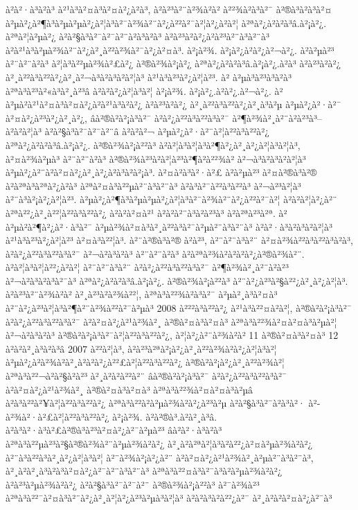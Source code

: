 à²à²·à³à²à³ à²¹à³à²¤à³à²¤à²¿à²à³, à²à²³à²¨à²¾à²à² à²²¾à²à³à²¯ à²®à³à²à³à²¤ à²µà²¿à²¶à³à²µà²µà²¿à²¦à³à²¯à²¾à²¨à²¿à²²à²¯à²¦à²¿à²à²¦ à²ªà²¿à²à²à³â.à²¡à²¿. à²ªà²¦à²µà²¿ à²à²§à³à²¯à²¯à²¨à²à³à²à³ à²à²³à²à²¿à²à²³à²¨à³à²¨à³ à²à²¹à³à²µà²¾à²¨à²¿à²¸à²²à²¾à²¯à²¿à²¤à³. à²¡à²¾. à²¡à²¿à²à²¿à²¬à²¿. à²à²µà²³ à²¨à²¨à²à³ à²¦à³à²²µà²¾à²£à²¿ à²®à²¾à²¡à²¿ à²ªà²¿à²à²à³â.à²¡à²¿.à²à³ à²à²³à²à²¿ à²¸à²²à³à²²à²¿à²¸à²¬à³à²à³à²à²¦à³ à²¹à³à²³à²¿à²¦à²³. à² à²µà³à²³à³à²à³ à²ªà³à²³à²«à³à²¸à²³â à²à²à²¿à²¦à³à²¦ à²¡à²¾. à²¡à²¿.à²à²¿.à²¬à²¿. à²à²µà²\circ à²¹à²¤à³à²¤à²¿à²\circ à²¹à³à²à²¿ à²à²³à²à²¿ à²¸à²²à³à²²à²¿à²¸à³à²µ à²µà²¿à²·à²¯ à²¤à²¿à²³à²¿à²¸à²¿, âà²®à²à²¡à³à²¯ à²à²¿à²²à³à²²à³à²¯ à²¶à²¾à²¸à²¨à²à²³à³– à²à²à²¦à³ à²à²§à³à²¯à²¯à²¨â à²à²à²¬ à²µà²¿à²·à²¯à²¦à²²à³à²²à²¿ à²ªà²¿à²à²à³â.à²¡à²¿. à²®à²¾à²¡à²²à³ à²à²¦à³à²¦à³à²¶à²¿à²¸à²¿à²¦à³à²¦à³, à²¤à²¾à²µà³ à²¨à²¨à²à³ à²®à²¾à²³à²à²¦à²³à²¶à²à²²¾à² à²¬à³à²à³à²à²¦à³ à²µà²¿à²¨à²à²¤à²¿à²¸à²¿à²à³à²à²¡à³. à²¤à²à³à²·à²£ à²à²µà²³ à²¤à²®à³à²® à²à²ªà³à²ªà²¿à²à³ à²ªà²¤à³à²²µà²¨à³à²¨à³ à²à³à²¯à²²à³à²²à³ à²¬à²³à²¦à³ à²¨à³à²¡à²¿à²¦à²³. à²µà²¿à²¶à³à²µà²µà²¿à²¦à³à²¯à²¾à²¨à²¿à²²à²¯à²¦ à²à²à²¦à²¿à²¨ à²ªà²²¿à²¸à²²¦à²²à³à²²à²¿ à²à²à²¤à²¹ à²à²à²¨à³à²à²³à³ à²à²ªà²³à²ª. à²à²µà²\circ à²¶à²¿à²·à³à²¯ à²µà²¾à²¤à³à²¸à²²à³à²¯à²µà²¨à³à²¨à³ à²à²·à³à²à³à²à²¦à³ à²¹à³à²³à²¿à²¦à²³ à²¤à³à²²¦à³. à²¨à²®à³à²® à²à²³, à²¨à²¨à³à²¨ à²¤à²¾à²²à³à²²à³à²à³, à²à²¿à²²à³à²²à³à²¯ à²¬à²à³à²à³ à²¨à²¨à²à³ à²à²ªà²¾à²\circ à²à²­à²¿à²®à²¾à²¨. à²à²¦à³à²¦à²²¿à²à²¦ à²¨à²¨à³à²¨ à²à²¿à²²à³à²²à³à²¯ à²¶à²¾à²¸à²¨à²à²³ à²¬à²à³à²à³à²¯à³ à²ªà²¿à²à²à³â.à²¡à²¿. à²®à²¾à²¡à²²à³ à²¨à²¿à²³à²§à²²¿à²¸à²¿à²¦à³. à²à²³à²¨à²¾à²à² à²¸à²³à²à²¾à²²¦, à²ªà³à²²¾à²à³à²¯ à²µà²¸à³à²¤à³ à²¨à²¿à²³à²¦à³à²¶à²¨à²¾à²²à²¯à²µà³ 2008 à²²²à³à²²à²¿ à²¹à³à²²¤à²à²¦, à²®à²à²¡à³à²¯ à²à²¿à²²à³à²²à³à²¯ à²à²¤à²¿à²¹à²¾à²¸ à²®à²¤à³à²¤à³ à²ªà³à²²¾à²¤à²¤à³à²µà²¦ à²¬à²à³à²à³ à²®à²à²¡à³à²¯à²¦à²²à³à²²à²¿, à²¦à²¿à²¨à²¾à²à² 11 à²®à²¤à³à²¤à³ 12 à²à²à²¸à³à²à³â 2007 à²²à²¦à³, à²à²³à²ªà²¡à²¿à²¸à²²à²¾à²à²¿à²¦à³à²¦ à²µà²¿à²à²¾à²\circ à²¸à²à²à²¿à²²£à²¦à²²à³à²²à²¿ à²®à²à²¡à²¿à²¸à²²à²¾à²¦ à²ªà³à²²¬à²à²§à²à²³ à²¸à²à²à²²à²¨ âà²®à²à²¡à³à²¯ à²à²¿à²²à³à²²à³à²¯ à²à²¤à²¿à²¹à²¾à²¸ à²®à²¤à³à²¤à³ à²ªà³à²²¾à²¤à²¤à³à²µâ à²à³à²²à²¥à²¦à²²à³à²²à²¿ à²ªà³à²²à²à²µà²¾à²à²¿à²³à²µ à²à²§à³à²¯à²à³à²· à²­à²¾à²·à²£à²¦à²²à³à²²à²¿ à²¡à²¾. à²à²®à³.à²à²¸à³â. à²à³à²·à³à²£à²®à³à²³à²¤à²¿à²¯à²µà²³ âà²à²·à³à²à³ à²ªà³à²²µà²³à²§à²®à²¾à²¨à²µà²¾à²à²¿ à²¸à²à²ªà²¦à³à²­à²²¿à²¤à²µà²¾à²à²¿ à²¨à³à²²à³à²¸à²¿à²¦à³à²¦ à²¨à²¾à²¡à²¿à²¨ à²à²¤à²¿à²¹à²¾à²¸à²µà²¨à³à²¨à³, à²¸à²à²¸à³à²à³à²¤à²¿à²¯à²¨à³à²¨à³ à²ªà³à²²¤à³à²¯à³à²à²µà²¾à²à²¿ à²à²³à²µà²¾à²à²¿ à²à²§à³à²¯à²¯à²¨ à²®à²¾à²¡à²²à³ à²¯à²¾à²³ à²ªà³à²²¯à²¤à³à²¨à²¿à²¸à²¦à²¿à²³à²µà³à²¦à³ à²à²à³à²à²²¿à²¯ à²¸à²à²à²¤à²¿à²¯à³ 